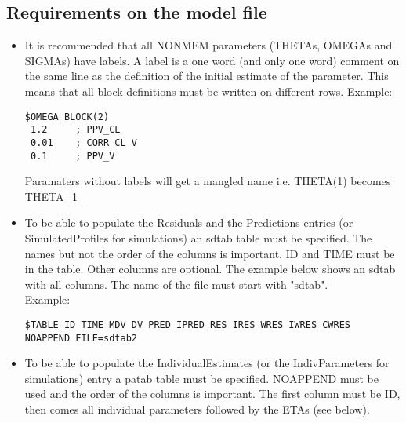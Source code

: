 \subsection{Requirements on the model file}
\begin{itemize}
    \item It is recommended that all NONMEM parameters (THETAs, OMEGAs and SIGMAs) have labels. A label is a one word (and only one word) comment on the same line as the definition of the initial estimate of the parameter. This means that all block definitions must be written on different rows. Example:
        \begin{verbatim}
$OMEGA BLOCK(2)
 1.2     ; PPV_CL
 0.01    ; CORR_CL_V
 0.1     ; PPV_V
        \end{verbatim}
        Paramaters without labels will get a mangled name i.e. THETA(1) becomes THETA\_1\_
    \item To be able to populate the Residuals and the Predictions entries (or SimulatedProfiles for simulations) an sdtab table must be specified. The names but not the order of the columns is important. ID and TIME must be in the table. Other columns are optional. The example below shows an sdtab with all columns. The name of the file must start with "sdtab".\\ Example:
        \begin{verbatim}
$TABLE ID TIME MDV DV PRED IPRED RES IRES WRES IWRES CWRES
NOAPPEND FILE=sdtab2
        \end{verbatim}
    \item To be able to populate the IndividualEstimates (or the IndivParameters for simulations) entry a patab table must be specified. NOAPPEND must be used and the order of the columns is important. The first column must be ID, then comes all individual parameters followed by the ETAs (see below).
    

\end{itemize}
